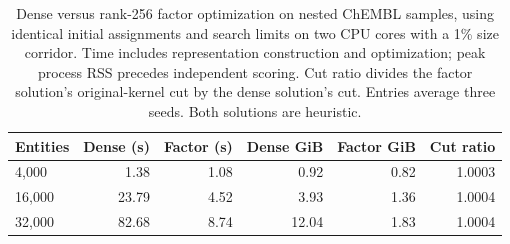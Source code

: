 \begin{table}[htbp]\centering\small
\begin{tabular}{lrrrrr}
\toprule
Entities & Dense (s) & Factor (s) & Dense GiB & Factor GiB & Cut ratio\\\midrule
4,000 & 1.38 & 1.08 & 0.92 & 0.82 & 1.0003\\
16,000 & 23.79 & 4.52 & 3.93 & 1.36 & 1.0004\\
32,000 & 82.68 & 8.74 & 12.04 & 1.83 & 1.0004\\
\bottomrule\end{tabular}
\caption{Dense versus rank-256 factor optimization on nested ChEMBL samples, using identical initial assignments and search limits on two CPU cores with a 1\% size corridor. Time includes representation construction and optimization; peak process RSS precedes independent scoring. Cut ratio divides the factor solution's original-kernel cut by the dense solution's cut. Entries average three seeds. Both solutions are heuristic.}
\label{tab:dense-scaling}
\end{table}
